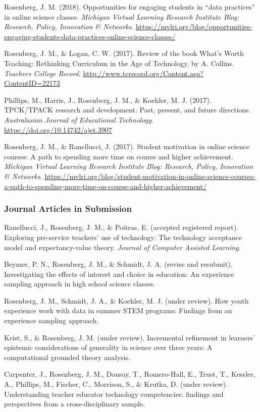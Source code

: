 \documentclass[14,]{article}
\begin{document}
Rosenberg, J. M. (2018). Opportunities for engaging students in ``data
practices'' in online science classes. \emph{Michigan Virtual Learning
Research Institute Blog: Research, Policy, Innovation \& Networks}.
\url{https://mvlri.org/blog/opportunities-engaging-students-data-practices-online-science-classes/}

Rosenberg, J. M., \& Logan, C. W. (2017). Review of the book What's
Worth Teaching: Rethinking Curriculum in the Age of Technology, by A.
Collins. \emph{Teachers College Record}.
\url{http://www.tcrecord.org/Content.asp?ContentID=22173}

Phillips, M., Harris, J., Rosenberg, J. M., \& Koehler, M. J. (2017).
TPCK/TPACK research and development: Past, present, and future
directions. \emph{Australasian Journal of Educational Technology}.
\url{https://doi.org/10.14742/ajet.3907}

Rosenberg, J. M., \& Ranellucci, J. (2017). Student motivation in online
science courses: A path to spending more time on course and higher
achievement. \emph{Michigan Virtual Learning Research Institute Blog:
Research, Policy, Innovation \& Networks}.
\url{https://mvlri.org/blog/student-motivation-in-online-science-courses-a-path-to-spending-more-time-on-course-and-higher-achievement/}

\subsubsection{Journal Articles in
Submission}\label{journal-articles-in-submission}

Ranellucci, J., Rosenberg, J. M., \& Poitras, E. (accepted registered
report). Exploring pre-service teachers' use of technology: The
technology acceptance model and expectancy-value theory. \emph{Journal
of Computer Assisted Learning}.

Beymer, P. N., Rosenberg, J. M., \& Schmidt, J. A. (revise and
resubmit). Investigating the effects of interest and choice in
education: An experience sampling approach in high school science
classes.

Rosenberg, J. M., Schmidt, J. A., \& Koehler, M. J. (under review). How
youth experience work with data in summer STEM programs: Findings from
an experience sampling approach.

Krist, S., \& Rosenberg, J. M. (under review). Incremental refinement in
learners' epistemic considerations of generality in science over three
years: A computational grounded theory analysis.

Carpenter, J., Rosenberg, J. M., Dousay, T., Romero-Hall, E., Trust, T.,
Kessler, A., Phillips, M., Fischer, C., Morrison, S., \& Krutka, D.
(under review). Understanding teacher educator technology competencies:
findings and perspectives from a cross-disciplinary sample.
\end{document}
